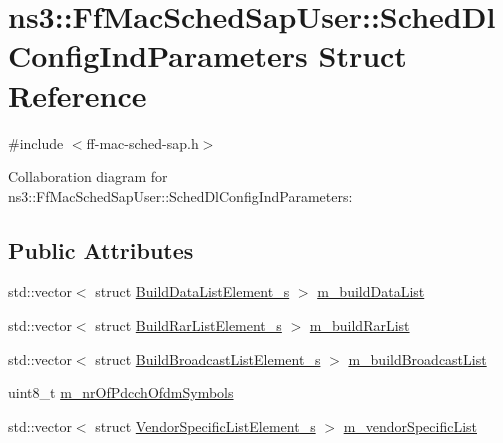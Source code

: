 \hypertarget{structns3_1_1FfMacSchedSapUser_1_1SchedDlConfigIndParameters}{}\section{ns3\+:\+:Ff\+Mac\+Sched\+Sap\+User\+:\+:Sched\+Dl\+Config\+Ind\+Parameters Struct Reference}
\label{structns3_1_1FfMacSchedSapUser_1_1SchedDlConfigIndParameters}


{\ttfamily \#include $<$ff-\/mac-\/sched-\/sap.\+h$>$}



Collaboration diagram for ns3\+:\+:Ff\+Mac\+Sched\+Sap\+User\+:\+:Sched\+Dl\+Config\+Ind\+Parameters\+:
\subsection*{Public Attributes}
\begin{DoxyCompactItemize}
\item 
std\+::vector$<$ struct \hyperlink{structns3_1_1BuildDataListElement__s}{Build\+Data\+List\+Element\+\_\+s} $>$ \hyperlink{structns3_1_1FfMacSchedSapUser_1_1SchedDlConfigIndParameters_a8537249a51522cfb9c914db12bfe1e2b}{m\+\_\+build\+Data\+List}
\item 
std\+::vector$<$ struct \hyperlink{structns3_1_1BuildRarListElement__s}{Build\+Rar\+List\+Element\+\_\+s} $>$ \hyperlink{structns3_1_1FfMacSchedSapUser_1_1SchedDlConfigIndParameters_abeb9922a08b6cb878a10d9422150b900}{m\+\_\+build\+Rar\+List}
\item 
std\+::vector$<$ struct \hyperlink{structns3_1_1BuildBroadcastListElement__s}{Build\+Broadcast\+List\+Element\+\_\+s} $>$ \hyperlink{structns3_1_1FfMacSchedSapUser_1_1SchedDlConfigIndParameters_a9502ab9049a295fbf973bb6e035a96d9}{m\+\_\+build\+Broadcast\+List}
\item 
uint8\+\_\+t \hyperlink{structns3_1_1FfMacSchedSapUser_1_1SchedDlConfigIndParameters_a442f6814cd1091f617705f21648320cc}{m\+\_\+nr\+Of\+Pdcch\+Ofdm\+Symbols}
\item 
std\+::vector$<$ struct \hyperlink{structns3_1_1VendorSpecificListElement__s}{Vendor\+Specific\+List\+Element\+\_\+s} $>$ \hyperlink{structns3_1_1FfMacSchedSapUser_1_1SchedDlConfigIndParameters_a8f4dc187f23f2ef682b4ac6ecab8d7be}{m\+\_\+vendor\+Specific\+List}
\end{DoxyCompactItemize}


